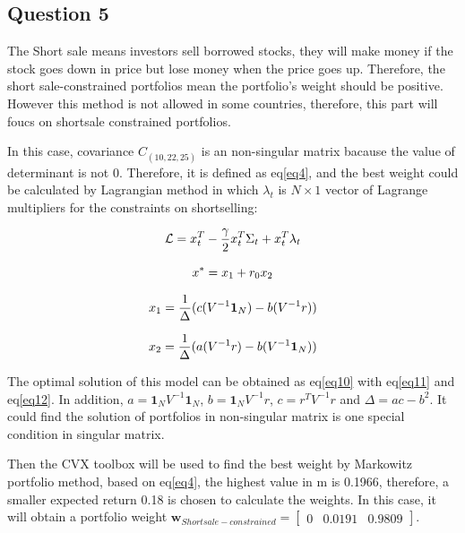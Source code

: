\documentclass[sigconf]{acmart}
\begin{document}
\subsection{Question 5}

The Short sale means investors sell borrowed stocks, they will make money if the stock goes down in price but lose money when the price goes up. Therefore, the short sale-constrained portfolios mean the portfolio's weight should be positive. However this method is not allowed in some countries, therefore, this part will foucs on shortsale constrained portfolios.


In this case, covariance $\hat{C}_{(10,22,25)}$ is an non-singular matrix bacause the value of determinant is not 0. Therefore, it is defined as eq\eqref{eq4}, and the best weight could be calculated by Lagrangian method in which $\lambda_{t}$ is $N\times1$ vector of Lagrange multipliers for the constraints on shortselling\cite{tian2016primal}:

\begin{equation} \label{eq9}
\setlength{\abovedisplayskip}{3pt}
\setlength{\belowdisplayskip}{3pt}
\mathcal{L} = x_{t}^{T}-\frac{\gamma}{2}x_{t}^{T}\Sigma_{t}+x_{t}^{T}\lambda_{t}
\end{equation}

\begin{equation} \label{eq10}
\setlength{\abovedisplayskip}{3pt}
\setlength{\belowdisplayskip}{3pt}
x^{*}=x_{1}+r_{0}x_{2}
\end{equation}

\begin{equation} \label{eq11}
\setlength{\abovedisplayskip}{3pt}
\setlength{\belowdisplayskip}{3pt}
x_{1}=\frac{1}{\Delta}(c(V^{-1}\bm{1}_{N})-b(V^{-1}r))
\end{equation}

\begin{equation} \label{eq12}
\setlength{\abovedisplayskip}{3pt}
\setlength{\belowdisplayskip}{3pt}
x_{2}=\frac{1}{\Delta}(a(V^{-1}r)-b(V^{-1}\bm{1}_{N}))
\end{equation}

The optimal solution of this model can be obtained as eq\eqref{eq10} with eq\eqref{eq11} and eq\eqref{eq12}. In addition, $a=\bm{1}_{N}V^{-1}\bm{1}_{N}$, $b=\bm{1}_{N}V^{-1}r$, $c=r^{T}V^{-1}r$ and $\Delta=ac-b^{2}$. It could find the solution of portfolios in non-singular matrix is one special condition in singular matrix.

Then the CVX toolbox will be used to find the best weight by Markowitz portfolio method, based on eq\eqref{eq4}, the highest value in m is 0.1966, therefore, a smaller expected return 0.18 is chosen to calculate the weights. In this case, it will obtain a portfolio weight $\bm{w}_{Shortsale-constrained} = \begin{bmatrix}0&0.0191&0.9809\end{bmatrix}$.
\end{document}
